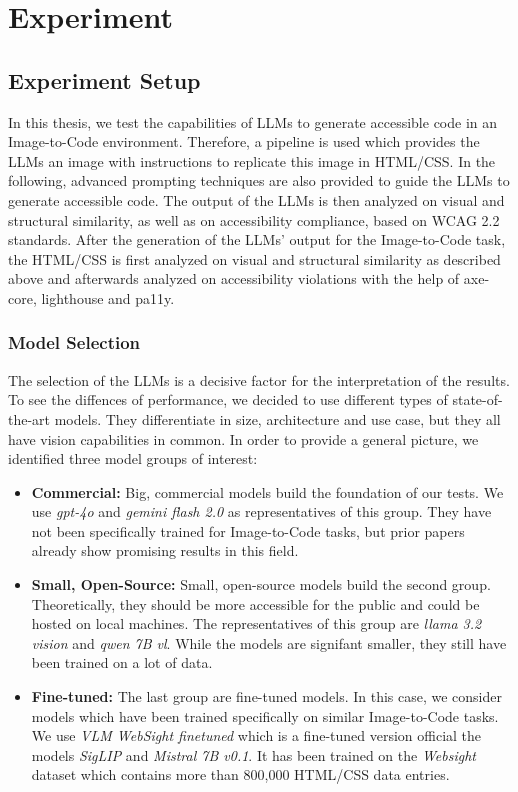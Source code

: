 \chapter{Experiment}\label{chapter:Experiment}

\section{Experiment Setup}
In this thesis, we test the capabilities of LLMs to generate accessible code in an 
Image-to-Code environment. Therefore, a pipeline is used which provides the LLMs an 
image with instructions to replicate this image in HTML/CSS. In the following, 
advanced prompting techniques are also provided to guide the LLMs to generate
accessible code. The output of the LLMs is then analyzed on visual and structural 
similarity, as well as on accessibility compliance, based on WCAG 2.2 standards.\newline
After the generation of the LLMs' output for the Image-to-Code task, the HTML/CSS
is first analyzed on visual and structural similarity as described above and afterwards
analyzed on accessibility violations with the help of axe-core, lighthouse and pa11y.


\subsection{Model Selection}
The selection of the LLMs is a decisive factor for the interpretation of the results.
To see the diffences of performance, we decided to use different types of 
state-of-the-art models. They differentiate in size, architecture and use case, but 
they all have vision capabilities in common.
In order to provide a general picture, we identified three model groups of interest:
\begin{itemize}
  \item \textbf{Commercial:} Big, commercial models build the foundation of our tests.
    We use \textit{gpt-4o} and \textit{gemini flash 2.0} as representatives of this group.
    They have not been specifically trained for Image-to-Code tasks, but prior papers 
    already show promising results in this field.
  \item \textbf{Small, Open-Source:} Small, open-source models build the second group. 
    Theoretically, they should be more accessible for the public and could be hosted 
    on local machines. The representatives of this group are \textit{llama 3.2 vision}
    and \textit{qwen 7B vl}. While the models are signifant smaller, they still have been 
    trained on a lot of data.
  \item \textbf{Fine-tuned:} The last group are fine-tuned models. In this case, we 
    consider models which have been trained specifically on similar Image-to-Code 
    tasks. We use \textit{VLM WebSight finetuned} which is a fine-tuned version official
    the models \textit{SigLIP} and \textit{Mistral 7B v0.1}. It has been trained on the 
    \textit{Websight} dataset which contains more than 800,000 HTML/CSS data entries. 
\end{itemize}

